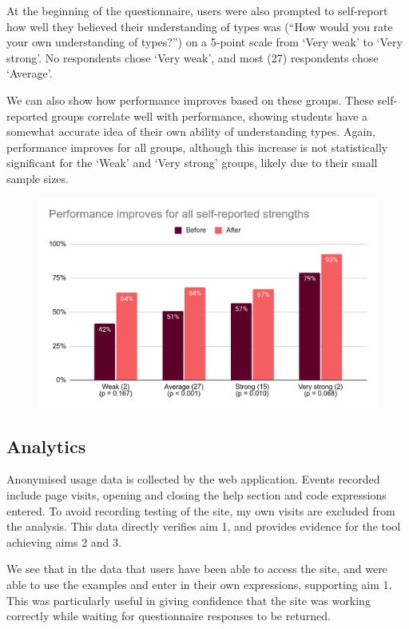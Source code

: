 \documentclass[a4paper,fleqn,12pt]{article}
\begin{document}
At the beginning of the questionnaire, users were also prompted to self-report how well they believed their understanding of types was (“How would you rate your own understanding of types?”) on a 5-point scale from ‘Very weak’ to ‘Very strong’. No respondents chose ‘Very weak’, and most (27) respondents chose ‘Average’.

We can also show how performance improves based on these groups. These self-reported groups correlate well with performance, showing students have a somewhat accurate idea of their own ability of understanding types. Again, performance improves for all groups, although this increase is not statistically significant for the ‘Weak’ and ‘Very strong’ groups, likely due to their small sample sizes.

{\centering \begin{figure}[h!]
  \centering
  \includegraphics[width=0.884\linewidth]{images/image26.png}
  \label{figure:Chart}
\end{figure} \par}
\subsection{Analytics}\label{id:h.67g05flyfv0z}
Anonymised usage data is collected by the web application. Events recorded include page visits, opening and closing the help section and code expressions entered. To avoid recording testing of the site, my own visits are excluded from the analysis. This data directly verifies aim 1, and provides evidence for the tool achieving aims 2 and 3.

We see that in the data that users have been able to access the site, and were able to use the examples and enter in their own expressions, supporting aim 1. This was particularly useful in giving confidence that the site was working correctly while waiting for questionnaire responses to be returned.
\end{document}

